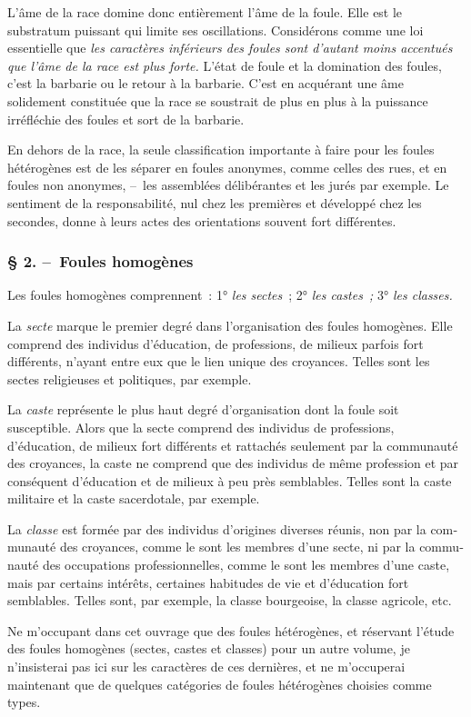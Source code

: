 \documentclass[french,twoside]{book} %
\begin{document}
L’âme de la race domine donc entièrement l’âme de la foule. Elle est le substratum puissant qui limite ses oscillations. Considérons comme une loi essentielle que \emph{les caractères inférieurs des foules sont d’autant moins accentués que l’âme de la race est plus forte.} L’état de foule et la domination des foules, c’est la barbarie ou le retour à la barbarie. C’est en acquérant une âme solidement constituée que la race se sous­trait de plus en plus à la puissance irréfléchie des foules et sort de la barbarie.\par
En dehors de la race, la seule classification importante à faire pour les foules hétérogènes est de les séparer en foules anonymes, comme celles des rues, et en foules non anonymes, – les assemblées délibérantes et les jurés par exemple. Le sentiment de la responsabilité, nul chez les premières et développé chez les secondes, donne à leurs actes des orientations souvent fort différentes.
\subsubsection[{§ 2. – Foules homogènes}]{§ 2. – Foules homogènes}
\noindent Les foules homogènes comprennent : 1°\emph{ les sectes} ; 2°\emph{ les castes ;} 3°\emph{ les classes.}\par
La \emph{secte} marque le premier degré dans l’organisation des foules homogènes. Elle comprend des individus d’éducation, de professions, de milieux parfois fort différents, n’ayant entre eux que le lien unique des croyances. Telles sont les sectes religieuses et politiques, par exemple.\par
La \emph{caste} représente le plus haut degré d’organisation dont la foule soit susceptible. Alors que la secte comprend des individus de professions, d’éducation, de mi­lieux fort différents et rattachés seulement par la communauté des croyances, la caste ne comprend que des individus de même profession et par conséquent d’éducation et de milieux à peu près semblables. Telles sont la caste militaire et la caste sacerdotale, par exemple.\par
La \emph{classe} est formée par des individus d’origines diverses réunis, non par la com­munauté des croyances, comme le sont les membres d’une secte, ni par la commu­nauté des occupations professionnelles, comme le sont les membres d’une caste, mais par certains intérêts, certaines habitudes de vie et d’éducation fort semblables. Telles sont, par exemple, la classe bourgeoise, la classe agricole, etc.\par
Ne m’occupant dans cet ouvrage que des foules hétérogènes, et réservant l’étude des foules homogènes (sectes, castes et classes) pour un autre volume, je n’insisterai pas ici sur les caractères de ces dernières, et ne m’occuperai maintenant que de quel­ques catégories de foules hétérogènes choisies comme types.
\end{document}
